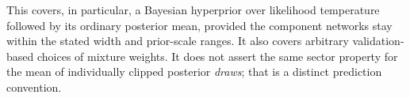 This covers, in particular, a Bayesian hyperprior over likelihood temperature followed by its ordinary posterior mean, provided the component networks stay within the stated width and prior-scale ranges. It also covers arbitrary validation-based choices of mixture weights. It does not assert the same sector property for the mean of individually clipped posterior \emph{draws}; that is a distinct prediction convention.
